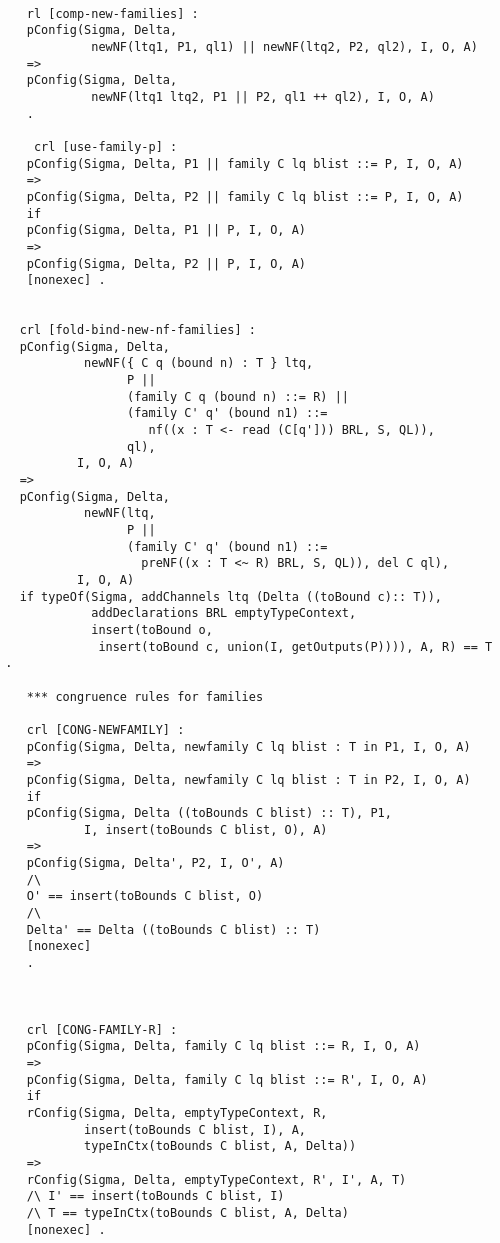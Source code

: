 \begin{lstlisting}
  
     rl [comp-new-families] : 
     pConfig(Sigma, Delta, 
              newNF(ltq1, P1, ql1) || newNF(ltq2, P2, ql2), I, O, A)
     => 
     pConfig(Sigma, Delta, 
              newNF(ltq1 ltq2, P1 || P2, ql1 ++ ql2), I, O, A) 
     .
     
      crl [use-family-p] : 
     pConfig(Sigma, Delta, P1 || family C lq blist ::= P, I, O, A)
     => 
     pConfig(Sigma, Delta, P2 || family C lq blist ::= P, I, O, A)
     if 
     pConfig(Sigma, Delta, P1 || P, I, O, A)
     => 
     pConfig(Sigma, Delta, P2 || P, I, O, A)
     [nonexec] .
      
      
    crl [fold-bind-new-nf-families] :
    pConfig(Sigma, Delta, 
             newNF({ C q (bound n) : T } ltq, 
                   P || 
                   (family C q (bound n) ::= R) || 
                   (family C' q' (bound n1) ::= 
                      nf((x : T <- read (C[q'])) BRL, S, QL)), 
                   ql),
            I, O, A)
    => 
    pConfig(Sigma, Delta, 
             newNF(ltq,
                   P || 
                   (family C' q' (bound n1) ::= 
                     preNF((x : T <~ R) BRL, S, QL)), del C ql),
            I, O, A)  
    if typeOf(Sigma, addChannels ltq (Delta ((toBound c):: T)),
              addDeclarations BRL emptyTypeContext, 
              insert(toBound o, 
               insert(toBound c, union(I, getOutputs(P)))), A, R) == T 
  . 
      
     *** congruence rules for families
       
     crl [CONG-NEWFAMILY] : 
     pConfig(Sigma, Delta, newfamily C lq blist : T in P1, I, O, A)
     =>  
     pConfig(Sigma, Delta, newfamily C lq blist : T in P2, I, O, A)
     if 
     pConfig(Sigma, Delta ((toBounds C blist) :: T), P1, 
             I, insert(toBounds C blist, O), A)
     =>
     pConfig(Sigma, Delta', P2, I, O', A)
     /\
     O' == insert(toBounds C blist, O)
     /\
     Delta' == Delta ((toBounds C blist) :: T)
     [nonexec]
     .

        
      
     crl [CONG-FAMILY-R] : 
     pConfig(Sigma, Delta, family C lq blist ::= R, I, O, A)
     => 
     pConfig(Sigma, Delta, family C lq blist ::= R', I, O, A)
     if 
     rConfig(Sigma, Delta, emptyTypeContext, R, 
             insert(toBounds C blist, I), A, 
             typeInCtx(toBounds C blist, A, Delta))
     =>
     rConfig(Sigma, Delta, emptyTypeContext, R', I', A, T) 
     /\ I' == insert(toBounds C blist, I)  
     /\ T == typeInCtx(toBounds C blist, A, Delta)
     [nonexec] .
     

\end{lstlisting}
